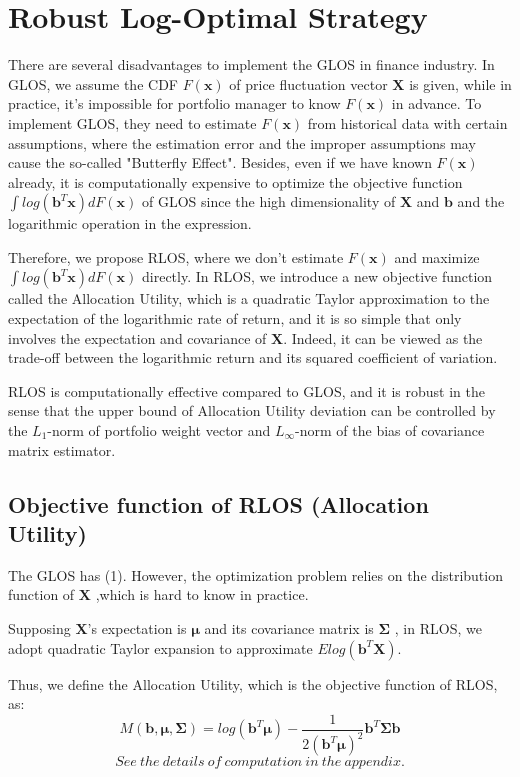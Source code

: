 \documentclass{gapd}
\begin{document}
\section{Robust Log-Optimal Strategy }

There are several disadvantages to implement the GLOS in finance industry. In GLOS, we assume the CDF $F(\textbf{x})$ of price fluctuation vector $\textbf{X}$ is given, while in practice, it's impossible for portfolio manager to know $F(\textbf{x})$ in advance. To implement GLOS, they need to estimate $F(\textbf{x})$ from historical data with certain assumptions, where the estimation error and the improper assumptions may cause the so-called "Butterfly Effect". Besides, even if we have known $F(\textbf{x})$ already, it is computationally expensive to optimize the objective function $\int{log(\textbf{b}^T\textbf{x})dF(\textbf{x})}$ of GLOS since the high dimensionality of $\textbf{X}$ and $\textbf{b}$ and the logarithmic operation in the expression.

Therefore, we propose RLOS, where we don't estimate $F(\textbf{x})$ and maximize $\int{log(\textbf{b}^T\textbf{x})dF(\textbf{x})}$ directly. In RLOS, we introduce a new objective function called the Allocation Utility, which is a quadratic Taylor approximation to the expectation of the logarithmic rate of return, and it is so simple that only involves the expectation and covariance of $\textbf{X}$. Indeed, it can be viewed as the trade-off between the logarithmic return and its squared coefficient of variation. 

RLOS is computationally effective compared to GLOS, and it is robust in the sense that the upper bound of Allocation Utility deviation can be controlled by the $L_1$-norm of portfolio weight vector and $L_{\infty}$-norm of the bias of covariance matrix estimator.  

\subsection{Objective function of RLOS (Allocation Utility) }

The GLOS has (1). However, the optimization problem relies on the distribution function of $\textbf{X}$ ,which is hard to know in practice.

Supposing $\textbf{X}$'s expectation is $\boldsymbol{\mu}$ and its covariance matrix is $\mathbf{\Sigma}$ , in RLOS, we adopt quadratic Taylor expansion to approximate $Elog(\textbf{b}^T\textbf{X})$.


Thus, we define the Allocation Utility, which is the objective function of RLOS, as: 
\begin{equation}
M(\mathbf{b},\boldsymbol{\mu},\boldsymbol{\Sigma})=log(\mathbf{b}^T \boldsymbol{\mu})-\frac{1}{2(\mathbf{b}^T\boldsymbol{\mu})^2}\mathbf{b}^T\mathbf{\Sigma}\mathbf{b}
\end{equation}
$$See\ the\ details\ of\ computation\ in\ the\ appendix.$$
\end{document}
